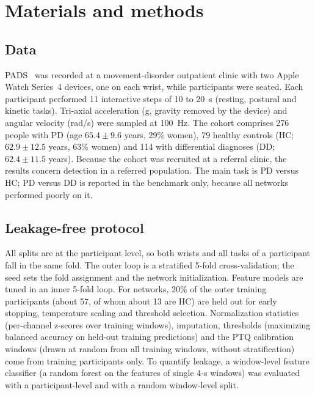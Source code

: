 \documentclass[preprint,12pt]{elsarticle}
\begin{document}
\section{Materials and methods}
\label{sec:methods}
\subsection{Data}
PADS~\cite{Varghese2024,PADSdata} was recorded at a movement-disorder outpatient clinic with two Apple Watch Series~4 devices, one on each wrist, while participants were seated. Each participant performed 11 interactive steps of 10 to 20~s (resting, postural and kinetic tasks). Tri-axial acceleration (g, gravity removed by the device) and angular velocity (rad/s) were sampled at 100~Hz. The cohort comprises 276 people with PD (age $65.4 \pm 9.6$ years, 29\% women), 79 healthy controls (HC; $62.9 \pm 12.5$ years, 63\% women) and 114 with differential diagnoses (DD; $62.4 \pm 11.5$ years). Because the cohort was recruited at a referral clinic, the results concern detection in a referred population. The main task is PD versus HC; PD versus DD is reported in the benchmark only, because all networks performed poorly on it.

\subsection{Leakage-free protocol}
All splits are at the participant level, so both wrists and all tasks of a participant fall in the same fold. The outer loop is a stratified 5-fold cross-validation; the seed sets the fold assignment and the network initialization. Feature models are tuned in an inner 5-fold loop. For networks, 20\% of the outer training participants (about 57, of whom about 13 are HC) are held out for early stopping, temperature scaling and threshold selection. Normalization statistics (per-channel z-scores over training windows), imputation, thresholds (maximizing balanced accuracy on held-out training predictions) and the PTQ calibration windows (drawn at random from all training windows, without stratification) come from training participants only. To quantify leakage, a window-level feature classifier (a random forest on the features of single 4-s windows) was evaluated with a participant-level and with a random window-level split.
\end{document}
